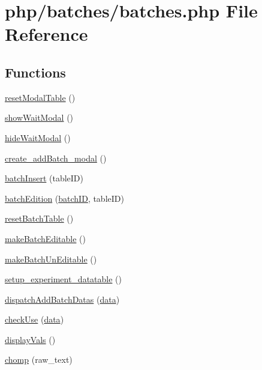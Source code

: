 \hypertarget{batches_8php}{\section{php/batches/batches.php File Reference}
\label{batches_8php}
}
\subsection*{Functions}
\begin{DoxyCompactItemize}
\item 
\hyperlink{batches_8php_aaf1585290b44b1c24947e6bffa5ccc51}{reset\-Modal\-Table} ()
\item 
\hyperlink{batches_8php_a1c5bd701b81e92f7d4d3c5df62308a90}{show\-Wait\-Modal} ()
\item 
\hyperlink{batches_8php_a9e9a0aeba0985269b23840a250abb827}{hide\-Wait\-Modal} ()
\item 
\hyperlink{batches_8php_ae02cea24a062a7f21bd48533c1504690}{create\-\_\-add\-Batch\-\_\-modal} ()
\item 
\hyperlink{batches_8php_aabf63657ee4a503e37183e428ef11db1}{batch\-Insert} (table\-I\-D)
\item 
\hyperlink{batches_8php_abb8ec322fc0eef58540ade5207c2ca41}{batch\-Edition} (\hyperlink{obsolete_2processing__bak_8php_a88c5bc4262b7c34f236357f5c53fc99b}{batch\-I\-D}, table\-I\-D)
\item 
\hyperlink{batches_8php_a04637a1b595da1d5ed13d255573db770}{reset\-Batch\-Table} ()
\item 
\hyperlink{batches_8php_afb025da899746c307e7b43a19a66fdad}{make\-Batch\-Editable} ()
\item 
\hyperlink{batches_8php_a78f6e359719fa425326a3b9b616c1d0b}{make\-Batch\-Un\-Editable} ()
\item 
\hyperlink{batches_8php_a3b7fa21c29f2265534745659558aab45}{setup\-\_\-experiment\-\_\-datatable} ()
\item 
\hyperlink{batches_8php_a0af6eec16d059e41ca9dc5f3840ad72e}{dispatch\-Add\-Batch\-Datas} (\hyperlink{chart1_8php_ab3ed669f4b3fdb8c88f3a190fb907de0}{data})
\item 
\hyperlink{batches_8php_a3c5593b7a45fafc8fefc2db97ac31de0}{check\-Use} (\hyperlink{chart1_8php_ab3ed669f4b3fdb8c88f3a190fb907de0}{data})
\item 
\hyperlink{batches_8php_a0eb64e41e5e954b1aaa81a84ee158278}{display\-Vals} ()
\item 
\hyperlink{batches_8php_aa1e8f9d59d36beb449d29324b83696c5}{chomp} (raw\-\_\-text)
\end{DoxyCompactItemize}


